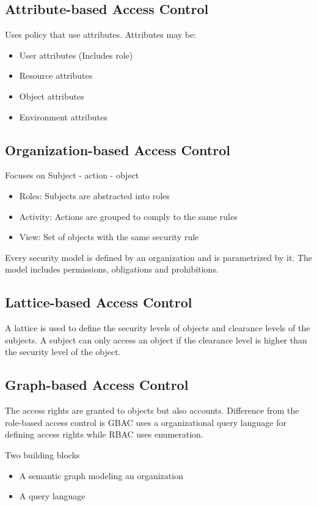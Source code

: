 \documentclass[11pt]{article} %
\begin{document}
\subsection{Attribute-based Access Control}

Uses policy that use attributes. Attributes may be:
\begin{itemize}		
\item User attributes (Includes role)
\item Resource attributes
\item Object attributes
\item Environment attributes
\end{itemize}

\subsection{Organization-based Access Control}
Focuses on Subject - action - object 
\begin{itemize}		
\item Roles: Subjects are abstracted into roles
\item Activity: Actions are grouped to comply to the same rules
\item View: Set of objects with the same security rule
\end{itemize}
Every security model is defined by an organization and is parametrized by it. The model includes permissions, obligations and prohibitions.


\subsection{Lattice-based Access Control}

A lattice is used to define the security levels of objects and clearance levels of the subjects. A subject can only access an object if the clearance level is higher than the security level of the object.


\subsection{Graph-based Access Control}
The access rights are granted to objects but also accounts. Difference from the  role-based access control is GBAC uses a organizational query language for defining access rights while RBAC uses enumeration.

Two building blocks
\begin{itemize}		
\item A semantic graph modeling an organization
\item A query language
\end{itemize}
\end{document}
